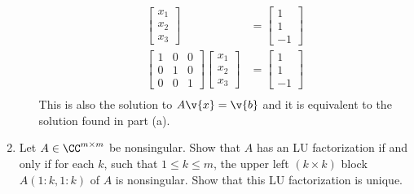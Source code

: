 \documentclass[11pt]{article}
\begin{document}
\begin{enumerate}
\begin{enumerate}
\begin{align*}
\begin{bmatrix}
                        x_1 \\
                        x_2 \\
                        x_3
                    \end{bmatrix}
                    &= 
                    \begin{bmatrix}
                        1 \\
                        1 \\
                        -1
                    \end{bmatrix} \\
                    \begin{bmatrix}
                        1 & 0 & 0 \\
                        0 & 1 & 0 \\
                        0 & 0 & 1
                    \end{bmatrix}
                    \begin{bmatrix}
                        x_1 \\
                        x_2 \\
                        x_3
                    \end{bmatrix}
                    &= 
                    \begin{bmatrix}
                        1 \\
                        1 \\
                        -1
                    \end{bmatrix} \\
                \end{align*}
                This is also the solution to $A\v{x} = \v{b}$ and it is
                equivalent to the solution found in part (a).
        \end{enumerate}

    \item %
        Let $A \in \CC^{m \times m}$ be nonsingular.
        Show that $A$ has an LU factorization if and only if for each $k$, such
        that $1 \le k \le m$, the upper left $(k \times k)$ block $A(1:k, 1:k)$
        of $A$ is nonsingular.
        Show that this LU factorization is unique.


\end{enumerate}
\end{document}
